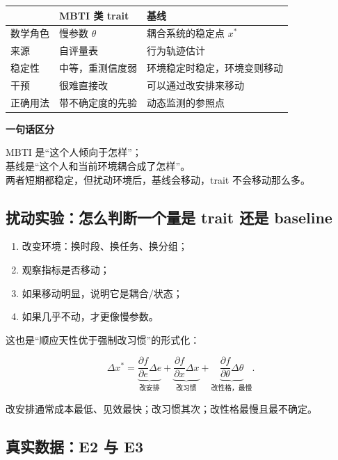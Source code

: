 \documentclass[UTF8,a4paper,11pt]{ctexart}
\newenvironment{explainbox}[1]
{\begin{center}\begin{minipage}{0.94\textwidth}\colorbox{boxbg}{\parbox{0.92\textwidth}{\textbf{#1}\par\vspace{2pt}}}}
{\end{minipage}\end{center}}
\begin{document}
\begin{center}
\begin{longtable}{@{}p{2.4cm}p{4.6cm}p{6.8cm}@{}}
\toprule
 & \textbf{MBTI 类 trait} & \textbf{基线} \\
\midrule
数学角色 & 慢参数 $\theta$ & 耦合系统的稳定点 $x^*$ \\
来源 & 自评量表 & 行为轨迹估计 \\
稳定性 & 中等，重测信度弱 & 环境稳定时稳定，环境变则移动 \\
干预 & 很难直接改 & 可以通过改安排来移动 \\
正确用法 & 带不确定度的先验 & 动态监测的参照点 \\
\bottomrule
\end{longtable}
\end{center}

\begin{explainbox}{一句话区分}
MBTI 是“这个人倾向于怎样”；\\
基线是“这个人和当前环境耦合成了怎样”。\\
两者短期都稳定，但扰动环境后，基线会移动，trait 不会移动那么多。
\end{explainbox}

\subsection{扰动实验：怎么判断一个量是 trait 还是 baseline}

\begin{enumerate}[leftmargin=2em]
\item 改变环境：换时段、换任务、换分组；
\item 观察指标是否移动；
\item 如果移动明显，说明它是耦合/状态；
\item 如果几乎不动，才更像慢参数。
\end{enumerate}

这也是“顺应天性优于强制改习惯”的形式化：

\begin{equation}
\Delta x^*
=
\underbrace{\frac{\partial f}{\partial e}\Delta e}_{\text{改安排}}
+
\underbrace{\frac{\partial f}{\partial x}\Delta x}_{\text{改习惯}}
+
\underbrace{\frac{\partial f}{\partial \theta}\Delta \theta}_{\text{改性格，最慢}}.
\end{equation}

改安排通常成本最低、见效最快；改习惯其次；改性格最慢且最不确定。

\subsection{真实数据：E2 与 E3}
\end{document}
